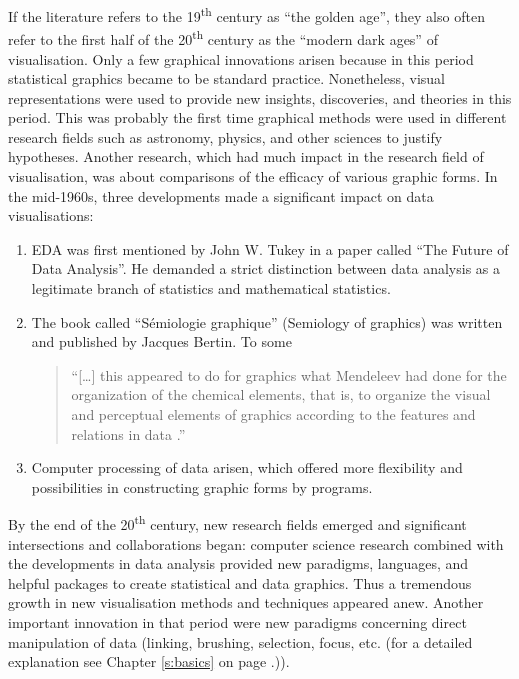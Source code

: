 If the literature refers to the 19\textsuperscript{th} century as ``the golden age'', they also often refer to the first half of the 20\textsuperscript{th} century as the ``modern dark ages'' of visualisation. Only a few graphical innovations arisen because in this period statistical graphics became to be standard practice. Nonetheless, visual representations were used to provide new insights, discoveries, and theories in this period. This was probably the first time graphical methods were used in different research fields such as astronomy, physics, and other sciences to justify hypotheses. Another research, which had much impact in the research field of visualisation, was about comparisons of the efficacy of various graphic forms. In the mid-1960s, three developments made a significant impact on data visualisations:
\begin{enumerate}
\item \ac{EDA} was first mentioned by John W. Tukey in a paper called ``The Future of Data Analysis''. He demanded a strict distinction between data analysis as a legitimate branch of statistics and mathematical statistics.
\item The book called ``Sémiologie graphique'' (Semiology of graphics) was written and published by Jacques Bertin. To some
\begin{quote}
``[\ldots] this appeared to do for graphics what Mendeleev had done for the organization of the chemical elements, that is, to organize the visual and perceptual elements of graphics according to the features and relations in data .''
\end{quote}
\label{crossref:bertain}
\item Computer processing of data arisen, which offered more flexibility and possibilities in constructing graphic forms by programs.
\end{enumerate}

By the end of the 20\textsuperscript{th} century, new research fields emerged and significant intersections and collaborations began: computer science research combined with the developments in data analysis provided new paradigms, languages, and helpful packages to create statistical and data graphics. Thus a tremendous growth in new visualisation methods and techniques appeared anew.
Another important innovation in that period were new paradigms  concerning direct manipulation of data (linking, brushing, selection, focus, etc. (for a detailed explanation see Chapter \ref{s:basics} on page \pageref{s:basics}.)).
